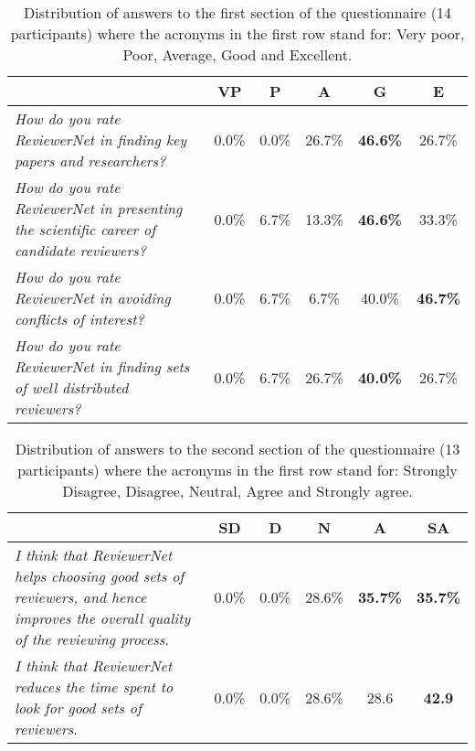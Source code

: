 \begin{table*}[!t]
	\renewcommand{\arraystretch}{1.3}
	\caption{ Distribution of answers to the first section of the questionnaire (14 participants) where the acronyms in the first row stand for: Very poor, Poor, Average, Good and Excellent.}
	\vspace{0.3cm}
	\label{table:formsection1}
    \centering%
		\begin{tabular}{|p{}|c|c|c|c|c|}
			\hline
			& VP & P & A & G & E\\
			\hline 
			{{\em How do you rate ReviewerNet in finding key papers and researchers?}}                      & 0.0\% & 0.0\% &  26.7\% & {\bf 46.6\%} & 26.7\% \\
			\hline
			{{\em How do you rate ReviewerNet in presenting the scientific career of candidate reviewers?}} & 0.0\% & 6.7\% &  13.3\% & {\bf 46.6\%} & 33.3\% \\
			\hline
			{{\em How do you rate ReviewerNet in avoiding conflicts of interest?}}                          & 0.0\% & 6.7\% &   6.7\% & 40.0\% & {\bf 46.7\%} \\
			\hline
			{{\em How do you rate ReviewerNet in finding sets of well distributed reviewers?}}              & 0.0\% & 6.7\% &  26.7\% & {\bf 40.0\%} & 26.7\% \\
			\hline
		\end{tabular}
\end{table*}

\begin{table*}[!t]
	\renewcommand{\arraystretch}{1.3}
	\caption{Distribution of answers to the second section of the questionnaire (13 participants) where the acronyms in the first row stand for: Strongly Disagree, Disagree, Neutral, Agree and Strongly agree.}
	\vspace{0.3cm}
	\label{table:formsection2}
    \centering%
		\begin{tabular}{|p{}|c|c|c|c|c|}
			\hline
			& SD & D & N & A & SA\\
			\hline 
			{{\em I think that ReviewerNet helps choosing good sets of reviewers, and hence improves the overall quality of the reviewing process}.} & 0.0\% & 0.0\% &  28.6\% & {\bf 35.7\%} & {\bf 35.7\%} \\
			\hline
			{{\em I think that ReviewerNet reduces the time spent to look for good sets of reviewers}.}                                              & 0.0\% & 0.0\% &  28.6\% & 28.6 & {\bf 42.9} \\
			\hline 
		\end{tabular}
	\par
\end{table*}

